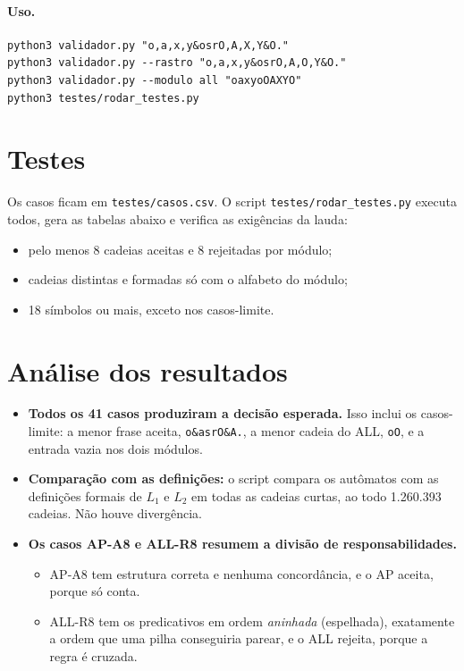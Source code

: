 \documentclass[11pt,a4paper]{article}
\newcommand{\cad}[1]{\texttt{#1}}       %
\newcommand{\Lum}{L_1}
\newcommand{\Ldois}{L_2}
\begin{document}
\paragraph{Uso.}
\begin{verbatim}
python3 validador.py "o,a,x,y&osrO,A,X,Y&O."
python3 validador.py --rastro "o,a,x,y&osrO,A,O,Y&O."
python3 validador.py --modulo all "oaxyoOAXYO"
python3 testes/rodar_testes.py
\end{verbatim}

\section{Testes}

Os casos ficam em \texttt{testes/casos.csv}. O script \texttt{testes/rodar\_testes.py} executa todos, gera as tabelas abaixo e verifica as exigências da lauda:
\begin{itemize}
  \item pelo menos 8 cadeias aceitas e 8 rejeitadas por módulo;
  \item cadeias distintas e formadas só com o alfabeto do módulo;
  \item 18 símbolos ou mais, exceto nos casos-limite.
\end{itemize}



\section{Análise dos resultados}

\begin{itemize}
  \item \textbf{Todos os 41 casos produziram a decisão esperada.} Isso inclui os casos-limite: a menor frase aceita, \cad{o\&asrO\&A.}, a menor cadeia do ALL, \cad{oO}, e a entrada vazia nos dois módulos.
  \item \textbf{Comparação com as definições:} o script compara os autômatos com as definições formais de $\Lum$ e $\Ldois$ em todas as cadeias curtas, ao todo 1.260.393 cadeias. Não houve divergência.
  \item \textbf{Os casos AP-A8 e ALL-R8 resumem a divisão de responsabilidades.}
  \begin{itemize}
    \item AP-A8 tem estrutura correta e nenhuma concordância, e o AP aceita, porque só conta.
    \item ALL-R8 tem os predicativos em ordem \emph{aninhada} (espelhada), exatamente a ordem que uma pilha conseguiria parear, e o ALL rejeita, porque a regra é cruzada.
  \end{itemize}
\end{itemize}
\end{document}
